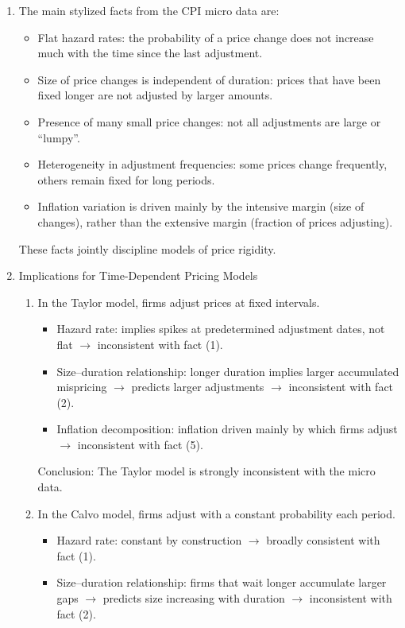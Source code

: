 \documentclass[12pt]{article}
\begin{document}
\begin{enumerate}
    \item The main stylized facts from the CPI micro data are:
    \begin{itemize}
        \item Flat hazard rates: the probability of a price change does not increase much with the time since the last adjustment.
        \item Size of price changes is independent of duration: prices that have been fixed longer are not adjusted by larger amounts.
        \item Presence of many small price changes: not all adjustments are large or ``lumpy''.
        \item Heterogeneity in adjustment frequencies: some prices change frequently, others remain fixed for long periods.
        \item Inflation variation is driven mainly by the intensive margin (size of changes), rather than the extensive margin (fraction of prices adjusting).
    \end{itemize}
    These facts jointly discipline models of price rigidity.
    \item Implications for Time-Dependent Pricing Models
    \begin{enumerate}
        \item In the Taylor model, firms adjust prices at fixed intervals.
        \begin{itemize}
            \item Hazard rate: implies spikes at predetermined adjustment dates, not flat $\rightarrow$ inconsistent with fact (1).
            \item Size–duration relationship: longer duration implies larger accumulated mispricing $\rightarrow$ predicts larger adjustments $\rightarrow$ inconsistent with fact (2).
            \item Inflation decomposition: inflation driven mainly by which firms adjust $\rightarrow$ inconsistent with fact (5).
        \end{itemize}
        Conclusion: The Taylor model is strongly inconsistent with the micro data.
        \item In the Calvo model, firms adjust with a constant probability each period.
        \begin{itemize}
            \item Hazard rate: constant by construction $\rightarrow$ broadly consistent with fact (1).
            \item Size–duration relationship: firms that wait longer accumulate larger gaps $\rightarrow$ predicts size increasing with duration $\rightarrow$ inconsistent with fact (2).

\end{itemize}
\end{enumerate}
\end{enumerate}
\end{document}
